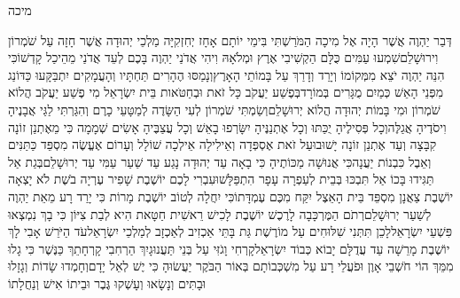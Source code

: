 \documentclass[../main/main.tex]{subfiles}
\begin{document}
\Incipit{}מיכה\par
\vspace{\afterchapskip}
\RTLmulticolcolumns
\begin{multicols}{\ncols}
דְּבַר יַהְוֶה אֲשֶׁר הָיָה אֶל מִיכָה הַמֹּרַשְׁתִּי בִּימֵי יוֹתָם אָחָז יְחִזְקִיָּה מַלְכֵי יְהוּדָה אֲשֶׁר חָזָה עַל שֹׁמְרוֹן וִירוּשָׁלֵם\PreVerseSpace{}שִׁמְעוּ עַמִּים כֻּלָּם הַקְשִׁיבִי אֶרֶץ וּמְלֹאָהּ וִיהִי אֲדֹנַי יַהְוֶה בָּכֶם לְעֵד אֲדֹנַי מֵהֵיכַל קָדְשׁוֹ\PreVerseSpace{}כִּי הִנֵּה יַהְוֶה יֹצֵא מִמְּקוֹמוֹ וְיָרַד וְדָרַךְ עַל בָּמוֹתֵי הָאָרֶץ\SubEnd{}\PreVerseSpace{}וְנָמַסּוּ הֶהָרִים תַּחְתָּיו וְהָעֲמָקִים יִתְבַּקָּעוּ כַּדּוֹנַג מִפְּנֵי הָאֵשׁ כְּמַיִם מֻגָּרִים בְּמוֹרָד\PreVerseSpace{}בְּפֶשַׁע יַעֲקֹב כָּל זֹאת וּבְחַטֹּאות בֵּית יִשְׂרָאֵל מִי פֶשַׁע יַעֲקֹב הֲלוֹא שֹׁמְרוֹן וּמִי בָּמוֹת יְהוּדָה הֲלוֹא יְרוּשָׁלֵם\PreVerseSpace{}וְשַׂמְתִּי שֹׁמְרוֹן לְעִי הַשָּׂדֶה לְמַטָּעֵי כָרֶם וְהִגַּרְתִּי לַגַּי אֲבָנֶיהָ וִיסֹדֶיהָ אֲגַלֶּה\PreVerseSpace{}וְכָל פְּסִילֶיהָ יֻכַּתּוּ וְכָל אֶתְנַנֶּיהָ יִשָּׂרְפוּ בָאֵשׁ וְכָל עֲצַבֶּיהָ אָשִׂים שְׁמָמָה כִּי מֵאֶתְנַן זוֹנָה קִבָּצָה וְעַד אֶתְנַן זוֹנָה יָשׁוּבוּ\PreVerseSpace{}עַל זֹאת אֶסְפְּדָה וְאֵילִילָה אֵילְכָה שׁוֹלָל\SubEnd{} וְעָרוֹם אֶעֱשֶׂה מִסְפֵּד כַּתַּנִּים וְאֵבֶל כִּבְנוֹת יַעֲנָה\PreVerseSpace{}כִּי אֲנוּשָׁה מַכּוֹתֶיהָ כִּי בָאָה עַד יְהוּדָה נָגַע עַד שַׁעַר עַמִּי עַד יְרוּשָׁלֵם\PreVerseSpace{}בְּגַת אַל תַּגִּידוּ בָּכוֹ אַל תִּבְכּוּ בְּבֵית לְעַפְרָה עָפָר הִתְפַּלָּשׁוּ\SubEnd{}\PreVerseSpace{}עִבְרִי לָכֶם יוֹשֶׁבֶת שָׁפִיר עֶרְיָה בֹשֶׁת לֹא יָצְאָה יוֹשֶׁבֶת צַאֲנָן מִסְפֵּד\SubEnd{} בֵּית הָאֵצֶל יִקַּח מִכֶּם עֶמְדָּתוֹ\PreVerseSpace{}כִּי יִחֲלָה\SubEnd{} לְטוֹב יוֹשֶׁבֶת מָרוֹת כִּי יָרַד רָע מֵאֵת יַהְוֶה לְשַׁעַר יְרוּשָׁלֵם\PreVerseSpace{}רְתֹם הַמֶּרְכָּבָה לָרֶכֶשׁ יוֹשֶׁבֶת לָכִישׁ רֵאשִׁית חַטָּאת הִיא לְבַת צִיּוֹן כִּי בָךְ נִמְצְאוּ פִּשְׁעֵי יִשְׂרָאֵל\PreVerseSpace{}לָכֵן תִּתְּנִי שִׁלּוּחִים עַל מוֹרֶשֶׁת גַּת בָּתֵּי אַכְזִיב לְאַכְזָב לְמַלְכֵי יִשְׂרָאֵל\PreVerseSpace{}עֹד הַיֹּרֵשׁ אָבִי לָךְ יוֹשֶׁבֶת מָרֵשָׁה עַד עֲדֻלָּם יָבוֹא כְּבוֹד יִשְׂרָאֵל\PreVerseSpace{}קָרְחִי וָגֹזִּי עַל בְּנֵי תַּעֲנוּגָיִךְ הַרְחִבִי קָרְחָתֵךְ כַּנֶּשֶׁר כִּי גָלוּ מִמֵּךְ \ClosedSection{}הוֹי חֹשְׁבֵי אָוֶן וּפֹעֲלֵי רָע עַל מִשְׁכְּבוֹתָם בְּאוֹר הַבֹּקֶר יַעֲשׂוּהָ כִּי יֶשׁ לְאֵל יָדָם\PreVerseSpace{}וְחָמְדוּ שָׂדוֹת וְגָזָלוּ וּבָתִּים וְנָשָׂאוּ וְעָשְׁקוּ גֶּבֶר וּבֵיתוֹ אִישׁ\SubEnd{} וְנַחֲלָתוֹ\OpenSection{}\par

\end{multicols}
\end{document}
